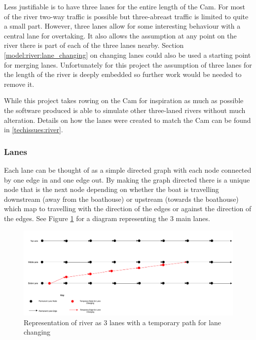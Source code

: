       Less justifiable is to have three lanes for the entire length of the Cam. For most of the river two-way traffic is possible but three-abreast traffic is limited to quite a small part. However, three lanes allow for some interesting behaviour with a central lane for overtaking. It also allows the assumption at any point on the river there is part of each of the three lanes nearby. Section \ref{model:river:lane_changing} on changing lanes could also be used a starting point for merging lanes. Unfortunately for this project the assumption of three lanes for the length of the river is deeply embedded so further work would be needed to remove it.
      
      While this project takes rowing on the Cam for inspiration as much as possible the software produced is able to simulate other three-laned rivers without much alteration. Details on how the lanes were created to match the Cam can be found in \ref{techissues:river}.
      
      \subsubsection{Lanes}\label{model:river:lanes}
      Each lane can be thought of as a simple directed graph with each node connected by one edge in and one edge out. By making the graph directed there is a unique node that is the next node depending on whether the boat is travelling downstream (away from the boathouse) or upstream (towards the boathouse) which map to travelling with the direction of the edges or against the direction of the edges. See Figure \ref{fig:model:lanes} for a diagram representing the 3 main lanes.
      
      \begin{figure}
      \begin{center}
      	\includegraphics[scale=0.3]{images/lanes.png}
      	\caption{Representation of river as 3 lanes with a temporary path for lane changing}
      	\label{fig:model:lanes}
      \end{center}
      \end{figure}
      
